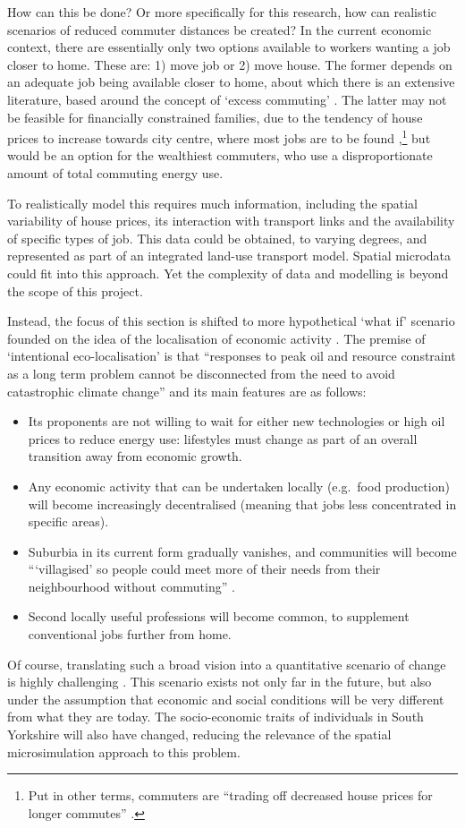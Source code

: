 \documentclass[a4paper, 11pt, twoside]{Thesis}
\begin{document}
How can this be done? Or more specifically for this research,
how can realistic scenarios of
reduced commuter distances be created? In the current economic context,
there are essentially only two options available to workers wanting a job
closer to home. These are: 1) move job or 2) move house. The former depends on
an adequate job being available closer to home, about which there is
an extensive literature, based around the concept of `excess commuting'
\citep{Buliung2002}.
The latter may not be feasible for financially constrained families,
due to the tendency of house prices to increase towards city centre, where
most jobs are to be found
\citep{Li2012},\footnote{Put in other terms,
commuters are ``trading off decreased house prices for longer commutes''
\citep[p.~312]{Li2012}.
}
but would be an option for the wealthiest commuters, who use a disproportionate
amount of total commuting energy use.

To realistically model this requires much information, including
the spatial variability
of house prices, its interaction with transport links and the availability
of specific types of job. This data could be obtained, to varying degrees,
and represented as part of an integrated land-use transport model.
Spatial microdata could fit into this approach.
Yet the complexity of data and modelling is beyond the scope of this project.

Instead, the focus of this section is shifted to more hypothetical `what if' scenario
founded on the idea of the localisation of economic activity \citep{North2010585}.
The
premise of `intentional eco-localisation' is that ``responses to peak oil and resource
constraint as a long term problem cannot be disconnected from the
need to avoid catastrophic climate change'' \citep[p.~585]{North2010585} and its main
features are as follows:
\begin{itemize}
 \item Its proponents are not willing to wait for either new technologies or
 high oil prices to reduce energy use: lifestyles must change as part of an
 overall transition away from economic growth.
 \item Any economic activity that can be undertaken locally (e.g.~food production)
 will become increasingly
 decentralised (meaning that jobs less concentrated in specific areas).
 \item Suburbia in its current form gradually vanishes, and communities
 will become ```villagised' so people could meet more of their needs from their
neighbourhood without commuting'' \citep[p.~591]{North2010585}.
 \item Second locally useful professions will become common,
 to supplement conventional jobs further from home.
\end{itemize}
Of course, translating such a broad vision into a quantitative scenario
of change is highly challenging \citep{Winther2013}. This scenario
exists not only far in the future, but also under the assumption that
economic and social conditions will be very different from what they are today.
The socio-economic traits of individuals in South Yorkshire will also have
changed, reducing the relevance of the spatial microsimulation approach to this
problem.
\end{document}
